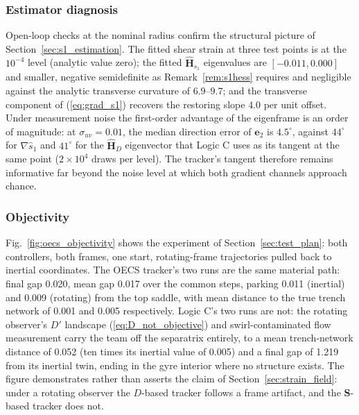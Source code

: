 \documentclass[lettersize,journal]{IEEEtran}
\begin{document}
\subsubsection{Estimator diagnosis}
Open-loop checks at the nominal radius confirm the structural picture
of Section~\ref{sec:s1_estimation}. The fitted shear strain at three
test points is at the $10^{-4}$ level (analytic value zero); the fitted
$\hat{\mathbf{H}}_{s_1}$ eigenvalues are $[-0.011, 0.000]$ and smaller,
negative semidefinite as Remark~\ref{rem:s1hess} requires and
negligible against the analytic transverse curvature of $6.9$--$9.7$;
and the transverse component of (\ref{eq:grad_s1}) recovers the
restoring slope $4.0$ per unit offset. Under measurement noise the
first-order advantage of the eigenframe is an order of magnitude: at
$\sigma_{uv} = 0.01$, the median direction error of $\mathbf{e}_2$ is
$4.5^\circ$, against $44^\circ$ for $\nabla\hat{s}_1$ and $41^\circ$
for the $\hat{\mathbf{H}}_D$ eigenvector that Logic C uses as its
tangent at the same point ($2\times 10^4$ draws per level). The
tracker's tangent therefore remains informative far beyond the noise
level at which both gradient channels approach chance.

\subsubsection{Objectivity}
Fig.~\ref{fig:oecs_objectivity} shows the experiment of
Section~\ref{sec:test_plan}: both controllers, both frames, one start,
rotating-frame trajectories pulled back to inertial coordinates. The
OECS tracker's two runs are the same material path: final gap 0.020,
mean gap 0.017 over the common steps, parking 0.011 (inertial) and
0.009 (rotating) from the top saddle, with mean distance to the true
trench network of 0.001 and 0.005 respectively. Logic C's two runs are
not: the rotating observer's $D'$ landscape (\ref{eq:D_not_objective})
and swirl-contaminated flow measurement carry the team off the
separatrix entirely, to a mean trench-network distance of 0.052 (ten
times its inertial value of 0.005) and a final gap of 1.219 from its
inertial twin, ending in the gyre interior where no structure exists.
The figure demonstrates rather than asserts the claim of
Section~\ref{sec:strain_field}: under a rotating observer the
$D$-based tracker follows a frame artifact, and the $\mathbf{S}$-based
tracker does not.
\end{document}
